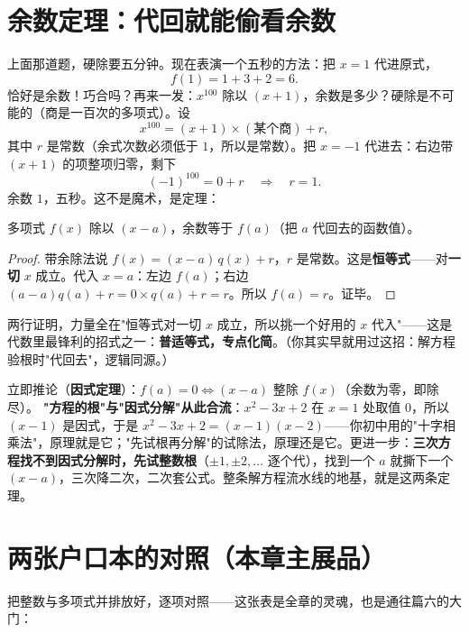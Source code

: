 \section{余数定理：代回就能偷看余数}

上面那道题，硬除要五分钟。现在表演一个五秒的方法：把 $x = 1$ 代进原式，
\[
f(1) = 1 + 3 + 2 = 6 .
\]
恰好是余数！巧合吗？再来一发：$x^{100}$ 除以 $(x+1)$，余数是多少？硬除是不可能的（商是一百次的多项式）。设
\[
x^{100} = (x+1)\times(\text{某个商}) + r ,
\]
其中 $r$ 是常数（余式次数必须低于 $1$，所以是常数）。把 $x = -1$ 代进去：右边带 $(x+1)$ 的项整项归零，剩下
\[
(-1)^{100} = 0 + r \quad\Longrightarrow\quad r = 1 .
\]
余数 $1$，五秒。这不是魔术，是定理：

\begin{dingli}[余数定理]
多项式 $f(x)$ 除以 $(x - a)$，余数等于 $f(a)$（把 $a$ 代回去的函数值）。
\end{dingli}
\begin{proof}
带余除法说 $f(x) = (x-a)\,q(x) + r$，$r$ 是常数。这是\textbf{恒等式}——对\textbf{一切} $x$ 成立。代入 $x = a$：左边 $f(a)$；右边 $(a-a)q(a) + r = 0\times q(a) + r = r$。所以 $f(a) = r$。证毕。
\end{proof}

两行证明，力量全在"恒等式对一切 $x$ 成立，所以挑一个好用的 $x$ 代入"——这是代数里最锋利的招式之一：\textbf{普适等式，专点化简}。（你其实早就用过这招：解方程验根时"代回去"，逻辑同源。）

立即推论（\textbf{因式定理}）：$f(a) = 0 \iff (x-a)$ 整除 $f(x)$（余数为零，即除尽）。
\textbf{"方程的根"与"因式分解"从此合流}：$x^2 - 3x + 2$ 在 $x=1$ 处取值 $0$，所以 $(x-1)$ 是因式，于是 $x^2-3x+2 = (x-1)(x-2)$——你初中用的"十字相乘法"，原理就是它；"先试根再分解"的试除法，原理还是它。更进一步：\textbf{三次方程找不到因式分解时，先试整数根}（$\pm1, \pm2, \dots$ 逐个代），找到一个 $a$ 就撕下一个 $(x-a)$，三次降二次，二次套公式。整条解方程流水线的地基，就是这两条定理。

\section{两张户口本的对照（本章主展品）}

把整数与多项式并排放好，逐项对照——这张表是全章的灵魂，也是通往篇六的大门：

